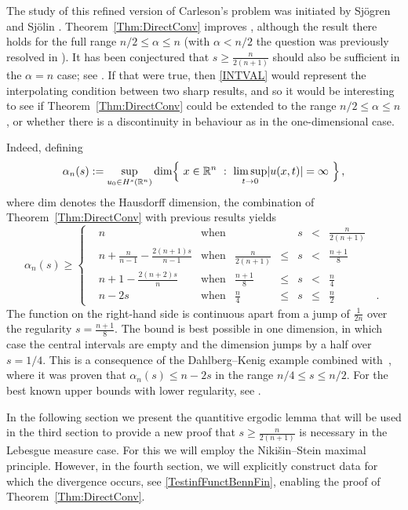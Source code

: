 \documentclass[biblatex]{pzorin-note}
\begin{document}
The study of this refined version of Carleson's problem was initiated by Sj\"ogren and Sj\"olin \cite{SS}. Theorem~\ref{Thm:DirectConv} improves \cite[Theorem 2]{LuR2}, although the result there holds for the full range $n/2\le \alpha\le n$ (with $\alpha<n/2$ the question was previously resolved in \cite{BBCR}).
It has been conjectured that $s\ge\frac{n}{2(n+1)}$ should also be sufficient in the $\alpha=n$ case; see \cite{DG}. If that were true, then \eqref{INTVAL} would represent the interpolating condition between two sharp results, and so it would be interesting to see if Theorem~\ref{Thm:DirectConv} could be extended to the range $n/2\le \alpha\le n$, or whether there is a discontinuity in behaviour as in the one-dimensional case.

Indeed, defining
\[\alpha_n(s):=\sup_{u_0\in H^s(\R^n)}\mathrm{dim}\Big\{\ x\in\mathbb{R}^n\ :\ \limsup_{t\to0}\abs{u(x,t)}=\infty \ \Big\} \, ,\]
where $\mathrm{dim}$ denotes the Hausdorff dimension, the combination of Theorem~\ref{Thm:DirectConv} with previous results yields
\begin{equation*}
\alpha_n(s)\ge \left \{
\begin{array}{rcccccccl}
&n &\text{when}&\!\!\!\!\!& \!\!&s\!\!&< &\!\!\!\frac{n}{2(n+1)}&\\ [0.8ex]
& n+\frac{n}{n-1}-\frac{2(n+1)s}{n-1} &\text{when}& \frac{n}{2(n+1)}\!\!\!\!\!&\le\!\!& s\!\!&<&\!\!\!\frac{n+1}{8}&\\ [0.8ex]
&n+1-\frac{2(n+2)s}{n} &\text{when}&\frac{n+1}{8}\!\!\!\!\!& \le\!\!& s\!\!&<& \!\!\!\frac{n}{4}&\\ [0.8ex]
& n-2s\qquad &\text{when}&\frac{n}{4} \!\!\!\!\!& \le \!\!& s\!\!&\le& \!\!\!\frac{n}{2}&\!\!\!\!\!\!\!\! \, .
\end{array}\right.
\end{equation*}
The function on the right-hand side is continuous apart from a jump of $\frac{1}{2n}$ over the regularity $s=\frac{n+1}{8}$. The bound is best possible in one dimension, in which case the central intervals are empty and the dimension jumps by a half over $s=1/4$. This is a consequence of the Dahlberg--Kenig example combined with~\cite{BBCR}, where it was proven that $\alpha_n(s)\le n-2s$ in the range $n/4\le s\le n/2$. For the best known upper bounds with lower regularity, see \cite[Theorem 1.2]{LuR}.



In the following section we present the quantitive ergodic lemma that will be used in the third section to provide a new proof that $s\ge\frac{n}{2(n+1)}$ is necessary in the Lebesgue measure case. For this we will employ the Niki\v sin--Stein maximal principle. However, in the fourth section, we will explicitly construct data for which the divergence occurs, see \eqref{TestinfFunctBennFin}, enabling the proof of Theorem~\ref{Thm:DirectConv}.
\end{document}
